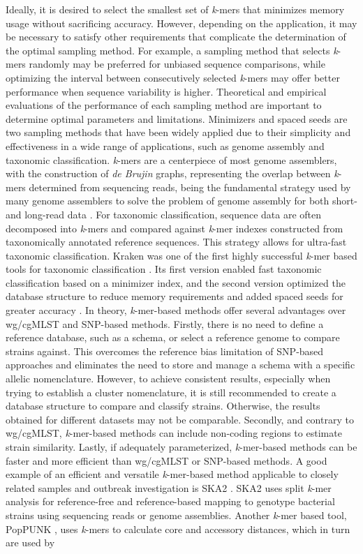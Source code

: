 Ideally, it is desired to select the smallest set of \textit{k}-mers that minimizes memory usage without sacrificing accuracy. However, depending on the application, it may be necessary to satisfy other requirements that complicate the determination of the optimal sampling method. For example, a sampling method that selects \textit{k}-mers randomly may be preferred for unbiased sequence comparisons, while optimizing the interval between consecutively selected \textit{k}-mers may offer better performance when sequence variability is higher. Theoretical and empirical evaluations of the performance of each sampling method are important to determine optimal parameters and limitations. Minimizers and spaced seeds are two sampling methods that have been widely applied due to their simplicity and effectiveness in a wide range of applications, such as genome assembly and taxonomic classification. \textit{k}-mers are a centerpiece of most genome assemblers, with the construction of \textit{de Brujin} graphs, representing the overlap between \textit{k}-mers determined from sequencing reads, being the fundamental strategy used by many genome assemblers to solve the problem of genome assembly for both short- and long-read data \cite{medvedev_what_2021}. For taxonomic classification, sequence data are often decomposed into \textit{k}-mers and compared against \textit{k}-mer indexes constructed from taxonomically annotated reference sequences. This strategy allows for ultra-fast taxonomic classification. Kraken was one of the first highly successful \textit{k}-mer based tools for taxonomic classification \cite{wood_kraken_2014}. Its first version enabled fast taxonomic classification based on a minimizer index, and the second version optimized the database structure to reduce memory requirements and added spaced seeds for greater accuracy \cite{wood_improved_2019}. In theory, \textit{k}-mer-based methods offer several advantages over \ac{wg/cgMLST} and \ac{SNP}-based methods. Firstly, there is no need to define a reference database, such as a schema, or select a reference genome to compare strains against. This overcomes the reference bias limitation of \ac{SNP}-based approaches and eliminates the need to store and manage a schema with a specific allelic nomenclature. However, to achieve consistent results, especially when trying to establish a cluster nomenclature, it is still recommended to create a database structure to compare and classify strains. Otherwise, the results obtained for different datasets may not be comparable. Secondly, and contrary to \ac{wg/cgMLST}, \textit{k}-mer-based methods can include non-coding regions to estimate strain similarity. Lastly, if adequately parameterized, \textit{k}-mer-based methods can be faster and more efficient than \ac{wg/cgMLST} or \ac{SNP}-based methods. A good example of an efficient and versatile \textit{k}-mer-based method applicable to closely related samples and outbreak investigation is SKA2 \cite{derelle_seamless_2024}. SKA2 uses split \textit{k}-mer analysis for reference-free and reference-based mapping to genotype bacterial strains using sequencing reads or genome assemblies. Another \textit{k}-mer based tool, PopPUNK \cite{lees_fast_2019}, uses \textit{k}-mers to calculate core and accessory distances, which in turn are used by 